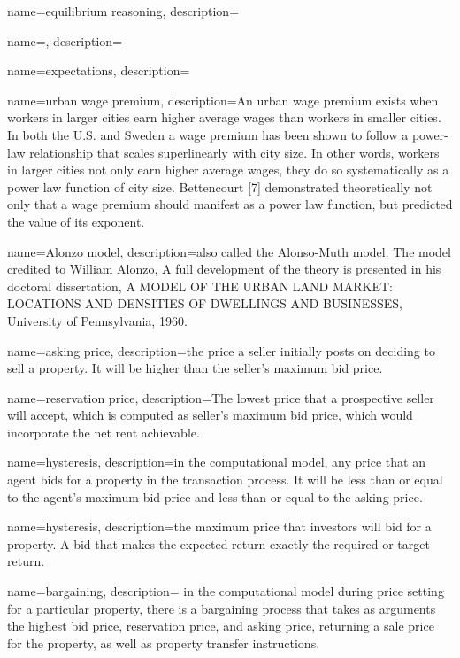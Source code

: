{
name=equilibrium reasoning,
description={}
}

{
name=,
description={ }
}

{
name=expectations,
description={ }
}

{
name=urban wage premium,
description={An urban wage premium exists when workers in larger cities earn higher average wages than workers in smaller cities. In both the U.S.  and Sweden a wage premium has been shown to follow a power-law relationship that scales superlinearly with city size. In other words, workers in larger cities not only earn higher average wages, they do so systematically as a power law function of city size. Bettencourt [7] demonstrated theoretically not only that a wage premium should manifest as a power law function, but predicted the value of its exponent. }
}

{
name=Alonzo model,
description={also called the Alonso-Muth model. The model credited to William Alonzo, A full development of the theory is presented in his doctoral dissertation, A MODEL OF THE URBAN LAND MARKET: LOCATIONS AND DENSITIES OF DWELLINGS AND BUSINESSES, University of Pennsylvania, 1960. }
}

{
name=asking price,
description={the price a seller initially posts on deciding to sell a property. It will be higher than the seller's maximum bid price.}
}

{
name=reservation  price,
description={The lowest price that a prospective seller will accept, which is computed as  seller's maximum bid price, which would incorporate the net rent achievable.}
}

{
name=hysteresis,
description={in  the computational model, any price that an agent bids for a property in the transaction process. It will be less than or equal to the agent's maximum bid price and less than or equal to the asking price.}
}

{
name=hysteresis,
description={the maximum price that investors will bid for a property. A bid that makes the expected return exactly the required or  target return.}
}

{
name=bargaining,
description= {in the computational model during price setting for a particular property, there is a bargaining process that takes as arguments the highest bid price, reservation price, and asking price, returning a sale price for the property, as well as property transfer instructions.}
}


